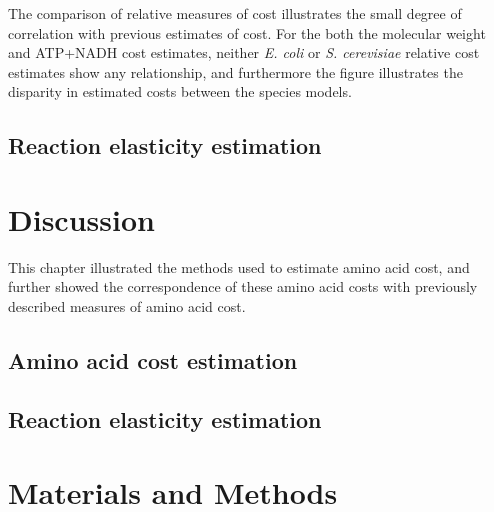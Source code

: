 The comparison of relative measures of cost illustrates the small degree of correlation with previous estimates of cost. For the both the molecular weight and ATP+NADH cost estimates, neither \emph{E. coli} or \emph{S. cerevisiae} relative cost estimates show any relationship, and furthermore the figure illustrates the disparity in estimated costs between the species models.

\subsection{Reaction elasticity estimation}

\section{Discussion}

This chapter illustrated the methods used to estimate amino acid cost, and further showed the correspondence of these amino acid costs with previously described measures of amino acid cost.

\subsection{Amino acid cost estimation}

\subsection{Reaction elasticity estimation}

\section{Materials and Methods}
